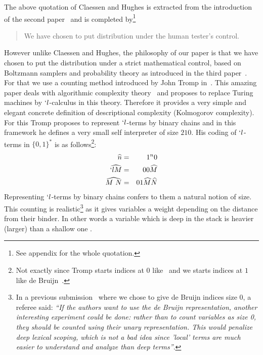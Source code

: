 \documentclass{sig-alternate}
\begin{document}
The above quotation of Claessen and Hughes is extracted from the introduction
of the second paper~\cite{DBLP:conf/icfp/ClaessenH00} and is completed
by\footnote{See appendix for the whole quotation.}
\begin{it}
  \begin{quotation} We have chosen to put distribution under the human tester's
    control.
  \end{quotation}
\end{it}
However unlike Claessen and Hughes, the philosophy of our paper is that we have
chosen to put the distribution under a strict mathematical control, based on
Boltzmann samplers and probability theory as introduced in the third
paper~\cite{DBLP:journals/cpc/DuchonFLS04}.  For that we use a counting method
introduced by John Tromp in~\cite{DBLP:conf/dagstuhl/Tromp06}.  This amazing paper
deals with algorithmic complexity theory~\cite{261084} and proposes to replace Turing
machines by $`l$-calculus in this theory. Therefore it provides a very simple and
elegant concrete definition of descriptional complexity (Kolmogorov complexity). For
this Tromp proposes to represent $`l$-terms by binary chains and in this framework he
defines a very small self interpreter of size $210$.  His coding of $`l$-terms in
$\{0,1\}^*$ is as follows\footnote{Not exactly since Tromp starts indices at $0$
  like~\cite{LescannePOPL94} and we starts indices at $1$ like de
  Bruijn~\cite{NGDeBruijn108}.}:
\begin{eqnarray*}
  \widehat{n} &=& 1^n0\\
  \widehat{`l M} &=& 00\widehat{M}\\
  \widehat{M\ N} &=& 01\widehat{M}\widehat{N}
\end{eqnarray*}
Representing $`l$-terms by binary chains confers to them a natural notion of size.
This counting is realistic\footnote{In a previous
  submission~\cite{DBLP:journals/jfp/GrygielL13} where we chose to give de Bruijn indices
  size $0$, a referee said: \emph{``If the authors want to use the de Bruijn
  representation, another interesting experiment could be done: rather than to count
  variables as size 0, they should be counted using their \emph{unary}
  representation.  This would penalize deep lexical scoping, which is not a bad idea
  since 'local' terms are much easier to understand and analyze than deep terms''}. }
as it gives variables a weight depending on the distance from their binder. In other
words a variable which is deep in the stack is heavier (larger) than a shallow one .
\end{document}
